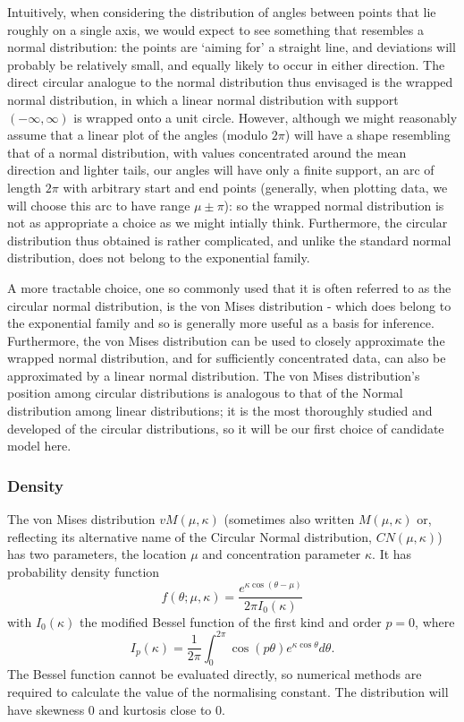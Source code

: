 \documentclass[../../ArchStats.tex]{subfiles}
\begin{document}
Intuitively, when considering the distribution of angles between points that lie roughly on a single axis, we would expect to see something that resembles a normal distribution: the points are `aiming for' a straight line, and deviations will probably be relatively small, and equally likely to occur in either direction. The direct circular analogue to the normal distribution thus envisaged is the wrapped normal distribution, in which a linear normal distribution with support $(-\infty, \infty)$ is wrapped onto a unit circle. However, although we might reasonably assume that a linear plot of the angles (modulo $2\pi$) will have a shape resembling that of a normal distribution, with values concentrated around the mean direction and lighter tails, our angles will have only a finite support, an arc of length $2\pi$ with arbitrary start and end points (generally, when plotting data, we will choose this arc to have range $\mu \pm \pi$): so the wrapped normal distribution is not as appropriate a choice as we might intially think. Furthermore, the circular distribution thus obtained is rather complicated, and unlike the standard normal distribution, does not belong to the exponential family.

A more tractable choice, one so commonly used that it is often referred to as the circular normal distribution, is the von Mises distribution - which does belong to the exponential family and so is generally more useful as a basis for inference. Furthermore, the von Mises distribution can be used to closely approximate the wrapped normal distribution, and for sufficiently concentrated data, can also be approximated by a linear normal distribution. The von Mises distribution's position among circular distributions is analogous to that of the Normal  distribution among linear distributions; it is the most thoroughly studied and developed of the circular distributions, so it will be our first choice of candidate model here. %

\subsubsection{Density}
The von Mises distribution $vM(\mu, \kappa)$ (sometimes also written $M(\mu, \kappa)$ or, reflecting its alternative name of the Circular Normal distribution, $CN(\mu, \kappa)$) has two parameters, the location $\mu$ and concentration parameter $\kappa$. It has probability density function 
\[f(\theta; \mu, \kappa) = \frac{e^{\kappa \cos(\theta - \mu)}}{2\pi I_0(\kappa)}\]
with $I_0(\kappa)$ the modified Bessel function of the first kind and order $p=0$, where
\begin{equation}
\label{eq:mod-Bessel}
I_p(\kappa) = \frac{1}{2\pi}\int_0^{2\pi} \cos(p\theta)e^{\kappa \cos \theta} d\theta.
\end{equation}
The Bessel function cannot be evaluated directly, so numerical methods are required to calculate the value of the normalising constant. The distribution will have skewness 0 and kurtosis close to 0.
\end{document}
